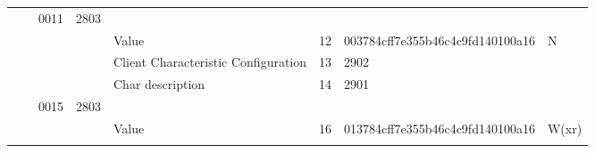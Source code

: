 \documentclass[conference]{IEEEtran}
\begin{document}
\begin{landscape}
\begin{table}[ht]
\begin{tabular}{@{}llllllll@{}}
                            &                             & \cellcolor[HTML]{FFFE65}0011 & \cellcolor[HTML]{FFFE65}2803 & \cellcolor[HTML]{FFFE65}                                                               & \cellcolor[HTML]{FFFE65} & \cellcolor[HTML]{FFFE65}         & \cellcolor[HTML]{FFFE65}                                                                                           \\
                            &                             &                              &                              & Value                                                                                  & 12                       & 003784cff7e355b46c4c9fd140100a16 & N                                                                                                                  \\
                            &                             &                              &                              & Client Characteristic Configuration                                                    & 13                       & 2902                             &                                                                                                                    \\
                            &                             &                              &                              & Char description                                                                       & 14                       & 2901                             &                                                                                                                    \\
                            &                             & \cellcolor[HTML]{FFFE65}0015 & \cellcolor[HTML]{FFFE65}2803 & \cellcolor[HTML]{FFFE65}                                                               & \cellcolor[HTML]{FFFE65} & \cellcolor[HTML]{FFFE65}         & \cellcolor[HTML]{FFFE65}                                                                                           \\
                            &                             &                              &                              & Value                                                                                  & 16                       & 013784cff7e355b46c4c9fd140100a16 & W(xr)                                                                                                              \\
\rowcolor[HTML]{3166FF} 

\end{tabular}
\end{table}
\end{landscape}
\end{document}
